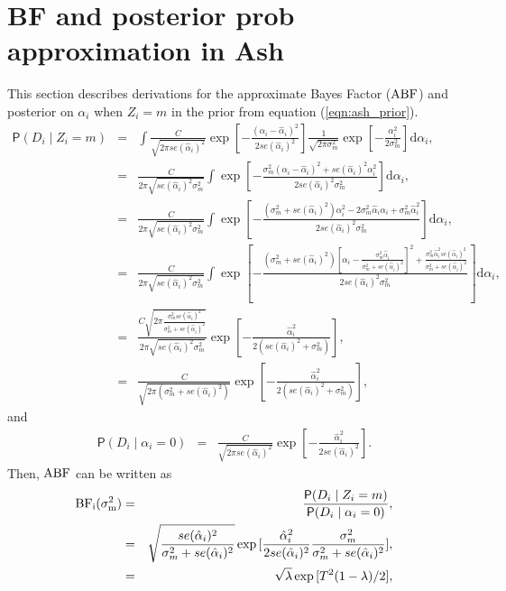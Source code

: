 \documentclass[12pt,letterpaper]{article}
\renewcommand{\Pr}{\mathsf{P}}
\newcommand{\given}{\mid}
\def\BF{\rm BF}
\def\ABF{\rm ABF}
\begin{document}
\section{BF and posterior prob approximation in Ash}
\label{sec:BF_post_Ash}
This section describes derivations for the approximate Bayes Factor ($\ABF$) and posterior on $\alpha_i$ when $Z_i = m$ in the prior from equation (\ref{eqn:ash_prior}).
\begin{eqnarray}
\Pr(D_i \given Z_i = m) &=& \int \frac{C}{\sqrt {2\pi se(\hat{\alpha}_i)^2 } }\exp{[-\frac{\left(\alpha_i -  \hat{\alpha}_i\right)^2}{2se(\hat{\alpha}_i)^2}]} \frac{1}{\sqrt {2\pi \sigma^2_m } }\exp{[-\frac{\alpha_i^2}{2\sigma^2_m}]}\mathrm{d}\alpha_i,\\
	&=&  \frac{C}{2\pi \sqrt {se(\hat{\alpha}_i)^2  \sigma^2_m }} \int \exp{[-\frac{\sigma^2_m\left(\alpha_i -  \hat{\alpha}_i\right)^2 + se(\hat{\alpha}_i)^2\alpha_i^2}{2se(\hat{\alpha}_i)^2\sigma^2_m}]}\mathrm{d}\alpha_i,\\
	&=&  \frac{C}{2\pi \sqrt {se(\hat{\alpha}_i)^2  \sigma^2_m }} \int \exp{[-\frac{ \left(\sigma^2_m + se(\hat{\alpha}_i)^2\right)\alpha_i^2 - 2\sigma^2_m \hat{\alpha}_i\alpha_i + \sigma^2_m\hat{\alpha}^2_i}{2se(\hat{\alpha}_i)^2\sigma^2_m}]}\mathrm{d}\alpha_i,\\
	&=&  \frac{C}{2\pi \sqrt {se(\hat{\alpha}_i)^2  \sigma^2_m }} \int \exp{[-\frac{\left(\sigma^2_m + se(\hat{\alpha}_i)^2\right)[\alpha_i- \frac{\sigma^2_m \hat{\alpha}_i}{\sigma^2_m + se(\hat{\alpha}_i)^2}]^2 + \frac{\sigma^2_m \hat{\alpha}^2_i se(\hat{\alpha}_i)^2}{\sigma^2_m + se(\hat{\alpha}_i)^2}}{2se(\hat{\alpha}_i)^2\sigma^2_m}]}\mathrm{d}\alpha_i,\\
	&=&  \frac{C\sqrt{2\pi \frac{\sigma^2_m se(\hat{\alpha}_i)^2}{\sigma^2_m + se(\hat{\alpha}_i)^2}}}{2\pi \sqrt {se(\hat{\alpha}_i)^2  \sigma^2_m }} \exp{[-\frac{\hat{\alpha}^2_i}{2(se(\hat{\alpha}_i)^2+\sigma^2_m)}]},\\
	&=&  \frac{C}{\sqrt{2\pi (\sigma^2_m + se(\hat{\alpha}_i)^2)}} \exp{[-\frac{\hat{\alpha}^2_i}{2(se(\hat{\alpha}_i)^2+\sigma^2_m)}]},
\end{eqnarray}
and 
\begin{eqnarray}
\Pr(D_i \given \alpha_i = 0) &=& \frac{C}{\sqrt {2\pi se(\hat{\alpha}_i)^2 } }\exp{[-\frac{\hat{\alpha}_i^2}{2se(\hat{\alpha}_i)^2}]}.
\end{eqnarray}
Then, $\ABF$ can be written as  
\begin{eqnarray}
\BF_i(\sigma^2_m) &=&  \frac{\Pr(D_i \given Z_i = m)}{\Pr(D_i \given \alpha_i = 0)},\\
			       &=&  \sqrt{\frac{se(\hat{\alpha}_i)^2}{\sigma^2_m + se(\hat{\alpha}_i)^2}}  \exp{[\frac{\hat{\alpha}_i^2}{2se(\hat{\alpha}_i)^2} \frac{\sigma^2_m}{\sigma^2_m + se(\hat{\alpha}_i)^2}]},\\
			       &=& \sqrt{\lambda} \exp{[T^2 (1-\lambda)/2]},
\end{eqnarray}
\end{document}
